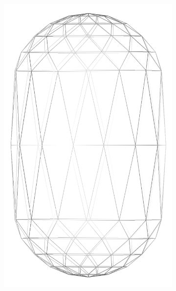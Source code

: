 \begin{figure}
\begin{center}
\begin{subfigure}{0.3\textwidth}
      \includegraphics[width=\textwidth]{assets/images/shapes/sphero_bug/med_2}
      \caption{}
      \label{fig:sphero_bug_med_2}
    \end{subfigure}
        \begin{subfigure}{0.3\textwidth}

\end{subfigure}
\end{center}
\end{figure}
